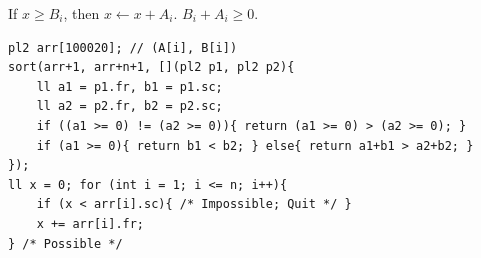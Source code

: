 If $x \ge B_i$, then $x \leftarrow x + A_i$. $B_i + A_i \ge 0$.
\begin{verbatim}
pl2 arr[100020]; // (A[i], B[i])
sort(arr+1, arr+n+1, [](pl2 p1, pl2 p2){
	ll a1 = p1.fr, b1 = p1.sc;
	ll a2 = p2.fr, b2 = p2.sc;
	if ((a1 >= 0) != (a2 >= 0)){ return (a1 >= 0) > (a2 >= 0); }
	if (a1 >= 0){ return b1 < b2; } else{ return a1+b1 > a2+b2; }
});
ll x = 0; for (int i = 1; i <= n; i++){
	if (x < arr[i].sc){ /* Impossible; Quit */ }
	x += arr[i].fr;
} /* Possible */
\end{verbatim}
